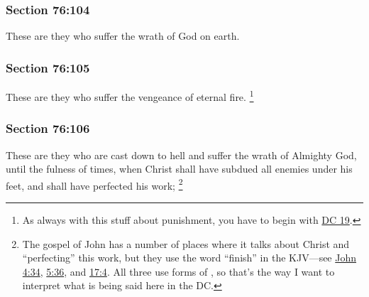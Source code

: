 	\subsubsection{Section 76:104} %
		\label{DC76-104}

		These are they who suffer the wrath of God on earth.


	\subsubsection{Section 76:105} %
		\label{DC76-105}

		These are they who suffer the vengeance of eternal fire.%
			\footnote{%
				As always with this stuff about punishment, you have to begin with \hyperref[DC19]{DC 19}.
				}


	\subsubsection{Section 76:106} %
		\label{DC76-106}

		These are they who are cast down to hell and suffer the wrath of Almighty God, until the fulness of times, when Christ shall have subdued all enemies under his feet, and shall have perfected his work;%
			\footnote{%
				The gospel of John has a number of places where it talks about Christ and ``perfecting'' this work, but they use the word ``finish'' in the KJV---see \hyperref[JOHN-4-34]{John 4:34}, \hyperref[JOHN-5-36]{5:36}, and \hyperref[JOHN-17-4]{17:4}. All three use forms of \hyperref[TELEIOO]{}, so that's the way I want to interpret what is being said here in the DC.
				}

